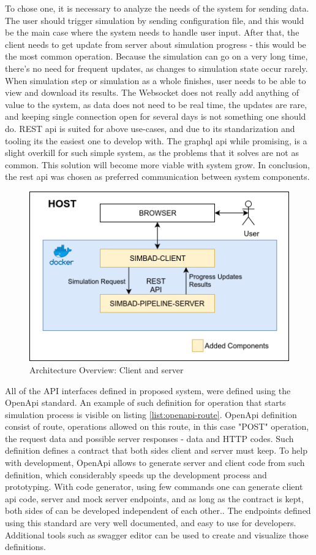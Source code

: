 To chose one, it is necessary to analyze the needs of the system for sending data. The user should trigger simulation by sending configuration file, and this would be the main case where the system needs to handle user input. After that, the client needs to get update from server about simulation progress - this would be the most common operation. Because the simulation can go on a very long time, there's no need for frequent updates, as changes to simulation state occur rarely. When simulation step or simulation as a whole finishes, user needs to be able to view and download its results. The Websocket does not really add anything of value to the system, as data does not need to be real time, the updates are rare, and keeping single connection open for several days is not something one should do.  REST api is suited for above use-cases, and due to its standarization and tooling its the easiest one to develop with. The graphql api while promising, is a slight overkill for such simple system, as the problems that it solves are not as common.  This solution will become more viable with system grow. In conclusion, the rest api was chosen as preferred communication between system components. 
\begin{figure}[h!]
	\centering
		\includegraphics[width=0.9\linewidth]{diagrams/arch2.png}
	\caption{Architecture Overview: Client and server}
	\label{fig:arch2}
\end{figure}
\newpage 
All of the API interfaces defined in proposed system, were defined using the OpenApi standard. An example of such definition for operation that starts simulation process is visible on listing \ref{list:openapi-route}. OpenApi definition consist of route, operations allowed on this route, in this case "POST" operation, the request data and possible server responses - data and HTTP codes. Such definition defines a contract that both sides client and server must keep. To help with development, OpenApi allows to generate server and client code from such definition, which considerably speeds up the development process and prototyping. With code generator, using few commands one can generate client api code, server and mock server endpoints, and as long as the contract is kept, both sides of can be developed independent of each other.. The endpoints defined using this standard are very well documented, and easy to use for developers. Additional tools such as swagger editor can be used to create and visualize those definitions. 

